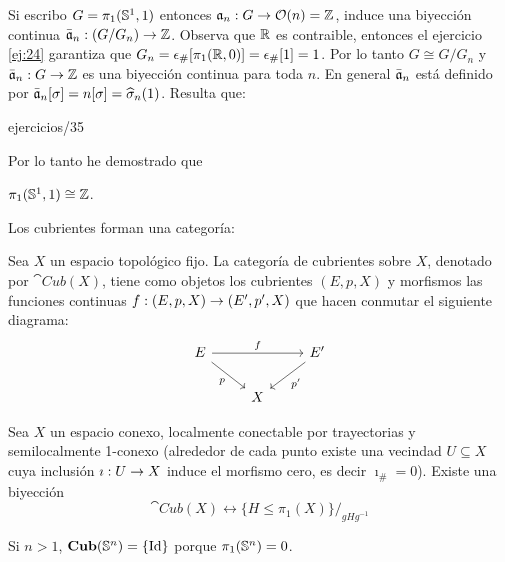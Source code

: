 \documentclass[../../topologia_algebraica]{subfiles}
\begin{document}
Si escribo $G=\pi_1(\mathbb{S}^1,1)$ entonces $\mathfrak{a}_n:G\rightarrow\mathcal{O}(n)=\mathbb{Z}$, induce una biyecci\'on continua
$\bar{\mathfrak{a}}_n:(G/G_n)\rightarrow\mathbb{Z}$. Observa que $\mathbb{R}$ es contraible, entonces el ejercicio \ref{ej:24}
garantiza que $G_n=\epsilon_{\#}[\pi_1(\mathbb{R},0)]=\epsilon_{\#}[1]=1$. Por lo tanto $G\cong G/G_n$
y $\bar{\mathfrak{a}}_n:G\rightarrow\mathbb{Z}$ es una biyecci\'on continua para toda $n$. En general $\bar{\mathfrak{a}}_n$ est\'a
definido por $\bar{\mathfrak{a}}_n[\sigma]=n[\sigma]=\widehat{ \sigma }_n(1)$. Resulta que:

{ejercicios/35} %

Por lo tanto he demostrado que

\begin{prop}
  $\pi_1(\mathbb{S}^1,1)\cong\mathbb{Z}$.
\end{prop}

Los cubrientes forman una categor\'ia:

\begin{defin}
  Sea $X$ un espacio topol\'ogico fijo. La categor\'ia de cubrientes sobre $X$, denotado por
  $\cat{Cub}(X)$, tiene como objetos los cubrientes $(E,p,X)$ y morfismos las funciones
  continuas $f:(E,p,X)\rightarrow(E',p',X)$ que hacen conmutar el siguiente diagrama:
  \[
    \begin{tikzcd}
      E \arrow[rr,"f"] \arrow[dr,"p"'] && E' \arrow[dl,"p'"] \\
      & X &
    \end{tikzcd}
  \]
\end{defin}

\begin{thm}
  Sea $X$ un espacio conexo, localmente conectable por trayectorias y semilocalmente 1-conexo
  (alrededor de cada punto existe una vecindad $U\subseteq X$ cuya inclusi\'on $\imath:U\rightarrow X$
  induce el morfismo cero, es decir $\imath_{\#}=0$). Existe una biyecci\'on
  \[
    \cat{Cub}(X) \longleftrightarrow \{H\leq\pi_1(X)\}/_{gHg^{-1}}
  \]
\end{thm}

\begin{ejemplo}
  Si $n>1$, $\mathbf{Cub}(\mathbb{S}^n)=\{\text{Id}\}$ porque $\pi_1(\mathbb{S}^n)=0$.
\end{ejemplo}
\end{document}
